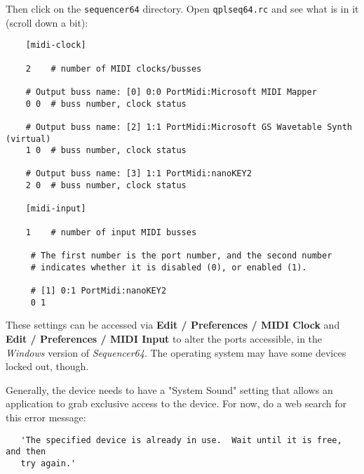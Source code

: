     Then click on the \texttt{sequencer64} directory.
    Open \texttt{qplseq64.rc} and see what is in it (scroll down a bit):

\begin{verbatim}
    [midi-clock]

    2    # number of MIDI clocks/busses

    # Output buss name: [0] 0:0 PortMidi:Microsoft MIDI Mapper
    0 0  # buss number, clock status

    # Output buss name: [2] 1:1 PortMidi:Microsoft GS Wavetable Synth (virtual)
    1 0  # buss number, clock status

    # Output buss name: [3] 1:1 PortMidi:nanoKEY2
    2 0  # buss number, clock status
    
    [midi-input]
    
    1    # number of input MIDI busses

	 # The first number is the port number, and the second number
	 # indicates whether it is disabled (0), or enabled (1).

	 # [1] 0:1 PortMidi:nanoKEY2
	 0 1
\end{verbatim}

   These settings can be accessed via
   \textbf{Edit / Preferences / MIDI Clock} and
   \textbf{Edit / Preferences / MIDI Input} to
	alter the ports accessible, in the \textsl{Windows}
   version of \textsl{Sequencer64}.
   The operating system may have some devices locked out, though.

   Generally, the device needs to have a "System Sound" setting that allows an
   application to grab exclusive access to the device.
   For now, do a web search for this error message:

\begin{verbatim}
   'The specified device is already in use.  Wait until it is free, and then
   try again.'
\end{verbatim}

